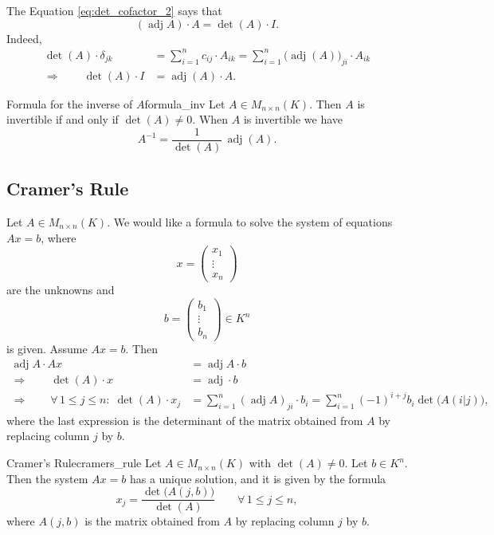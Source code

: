 The Equation \eqref{eq:det_cofactor_2} says that
\[
	\label{eq:adjoint}
	(\operatorname{adj}A) \cdot A = \det(A) \cdot I.
\]
Indeed, 
\begin{align*}
	 \det(A) \cdot \delta_{jk} &= \sum_{i=1}^{n} c_{ij} \cdot A_{ik} = \sum_{i=1}^{n} \big(\operatorname{adj}(A)\big)_{ji} \cdot A_{ik} \\
	 \Longrightarrow \qquad \det(A) \cdot I &= \operatorname{adj}(A) \cdot A.
\end{align*}

\begin{theorem}{Formula for the inverse of $A$}{formula_inv}
	Let $A \in M_{n\times n}(K)$. Then $A$ is invertible if and only if $\det(A) \neq 0$. When $A$ is invertible we have
	\[
		A^{-1} = \frac{1}{\det(A)} \, \operatorname{adj}(A).
	\]
\end{theorem}

\subsection{Cramer's Rule}
Let $A \in M_{n\times n}(K)$. We would like a formula to solve the system of equations $A x = b$, where
\[
	x = \begin{pmatrix}
		x_1\\
		\vdots \\
		x_n
	\end{pmatrix}
\]
are the unknowns and
\[
	b= \begin{pmatrix}
		b_1\\
		\vdots \\
		b_n
	\end{pmatrix} \in K^n
\]
is given. Assume $Ax = b$. Then
\begin{align*}
	\operatorname{adj}A \cdot A x &= \operatorname{adj}A \cdot b\\
	\Longrightarrow \qquad \det(A) \cdot x &= \operatorname{adj}\cdot b\\
	\Longrightarrow \qquad \forall \, 1 \leq j \leq n : \; \det(A)\cdot x_j &= \sum_{i=1}^{n} (\operatorname{adj}A)_{ji}\cdot  b_i = \sum_{i=1}^{n} (-1)^{i+j} b_i \det\big(A(i|j)\big),
\end{align*}
where the last expression is the determinant of the matrix obtained from $A$ by replacing column $j$ by $b$.

\begin{theorem}{Cramer's Rule}{cramers_rule}
	Let $A \in M_{n\times n}(K)$ with $\det(A) \neq 0$. Let $b \in K^n$. Then the system $A x = b$ has a unique solution, and it is given by the formula
	\[
		x_j = \frac{\det\big(A(j, b)\big)}{\det(A)} \qquad \forall \, 1 \leq j \leq n,
	\]
	where $A(j, b)$ is the matrix obtained from $A$ by replacing column $j$ by $b$.
\end{theorem}

